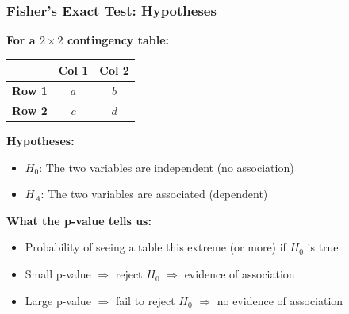 \documentclass{beamer}
\begin{document}
\begin{frame}
\frametitle{Fisher's Exact Test: Hypotheses}
\textbf{For a $2 \times 2$ contingency table:}

\vspace{0.3cm}
\begin{center}
\begin{tabular}{l|cc}
& \textbf{Col 1} & \textbf{Col 2} \\
\hline
\textbf{Row 1} & $a$ & $b$ \\
\textbf{Row 2} & $c$ & $d$ \\
\end{tabular}
\end{center}

\vspace{0.5cm}
\textbf{Hypotheses:}
\begin{itemize}
\item $H_0$: The two variables are independent (no association)
\item $H_A$: The two variables are associated (dependent)
\end{itemize}

\vspace{0.5cm}
\textbf{What the p-value tells us:}
\begin{itemize}
\item Probability of seeing a table this extreme (or more) if $H_0$ is true
\item Small p-value $\Rightarrow$ reject $H_0$ $\Rightarrow$ evidence of association
\item Large p-value $\Rightarrow$ fail to reject $H_0$ $\Rightarrow$ no evidence of association
\end{itemize}
\end{frame}
\end{document}

